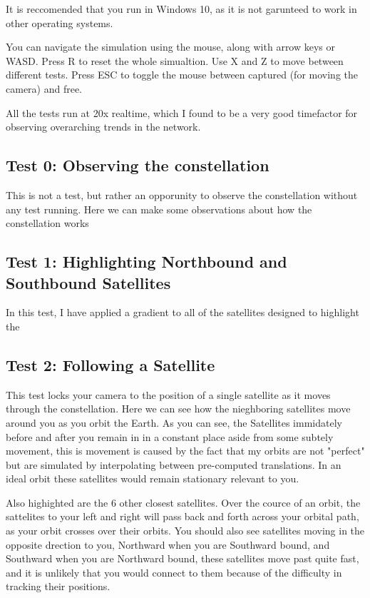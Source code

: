 \documentclass[12pt]{article}
\begin{document}
It is reccomended that you run in Windows 10, as it is not garunteed to work in other operating systems.

You can navigate the simulation using the mouse, along with arrow keys or WASD. Press R to reset the whole simualtion. Use X and Z to move between different tests. Press ESC to toggle the mouse between captured (for moving the camera) and free.

All the tests run at 20x realtime, which I found to be a very good timefactor for observing overarching trends in the network.

\subsection{Test 0: Observing the constellation}

This is not a test, but rather an opporunity to observe the constellation without any test running. Here we can make some observations about how the constellation works %

\subsection{Test 1: Highlighting Northbound and Southbound Satellites}

In this test, I have applied a gradient to all of the satellites designed to highlight the %

\subsection{Test 2: Following a Satellite}

This test locks your camera to the position of a single satellite as it moves through the constellation. Here we can see how the nieghboring satellites move around you as you orbit the Earth. As you can see, the Satellites immidately before and after you remain in in a constant place aside from some subtely movement, this is movement is caused by the fact that my orbits are not "perfect" but are simulated by interpolating between pre-computed translations. In an ideal orbit these satellites would remain stationary relevant to you.

Also highighted are the 6 other closest satellites. Over the cource of an orbit, the sattelites to your left and right will pass back and forth across your orbital path, as your orbit crosses over their orbits. You should also see satellites moving in the opposite drection to you, Northward when you are Southward bound, and Southward when you are Northward bound, these satellites move past quite fast, and it is unlikely that you would connect to them because of the difficulty in tracking their positions. \cite{OriginalReport} 
\end{document}
